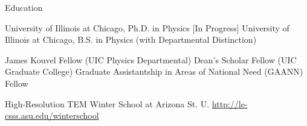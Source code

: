 \begin{rubric}{Education}


  \entry*[2005 --- \ldots] University of Illinois at Chicago, Ph.D. in Physics [In Progress]
  \entry*[2002 --- 2005] University of Illinois at Chicago, B.S. in Physics (with Departmental Distinction)
  

  \entry*[2011 --- 2012] James Kouvel Fellow (UIC Physics Departmental)
  \entry*[2011 --- 2012] Dean's Scholar Fellow (UIC Graduate College)
  \entry*[2007 --- 2010] Graduate Assistantship in Areas of National Need (GAANN) Fellow


  \entry*[Jan 2009] High-Resolution TEM Winter School at Arizona St. U. \url{http://le-csss.asu.edu/winterschool}
\end{rubric}

